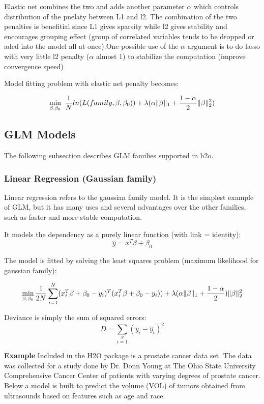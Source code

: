 \documentclass[11pt]{article}
\begin{document}
Elastic net combines the two and adds another parameter $\alpha$ which controls distribution of the pnelaty between L1 and l2. The combination of the two penalties is benefitial since L1 gives sparsity while l2 gives stability and encourages grouping effect (group of correlated variables tends to be dropped or aded into the model all at once).One possible use of the $\alpha$ argument is to do lasso with very little l2 penalty ($\alpha$ almost 1) to stabilize the computation (improve convergence speed)

Model fitting problem with elastic net penalty becomes:

\[ \min\limits_{\beta,\beta_0}\ {{1\over{N}} ln(L(family,\beta,\beta_0))  + \lambda (\alpha \| \beta \|_1}  + {1- \alpha \over 2} \| \beta \|_2^2) \]


\subsection{GLM Models} 
The following subsection describes GLM families supported in h2o. 

\subsubsection{Linear Regression (Gaussian family) }
Linear regression refers to the gaussian family model. It is the simplest example of GLM, but it has many uses and several advantages over the other families, such as faster and more stable computation. 

It models the dependency as a purely linear function (with link = identity):
\[ \hat{y} = x^T\beta + \beta_0\]

The model is fitted by solving the least squares problem (maximum likelihood for gaussian family):

\[ \min\limits_{\beta,\beta_0} { {1 \over 2N}\sum\limits_{i=1}\limits^{N}(x_i^{T}\beta  + \beta_0- y_i)^T (x_i^{T}\beta + \beta_0 - y_i))  + \lambda (\alpha \|\beta \|_1 + {1-\alpha \over 2}) \| \beta \|_2^2} \]


Deviance is simply the sum of squared errors:
\[ D = \sum\limits_{i=1}\limits^{N}{(y_i - \hat{y}_i)^2} \]


\textbf{Example}
Included in the H2O package is a prostate cancer data set. The data was collected for a study done by Dr. Donn Young at The Ohio State University Comprehensive Cancer Center of patients with varying degrees of prostate cancer. Below a model is built to predict the volume (VOL) of tumors obtained from ultrasounds based on features such as age and race.
\end{document}

